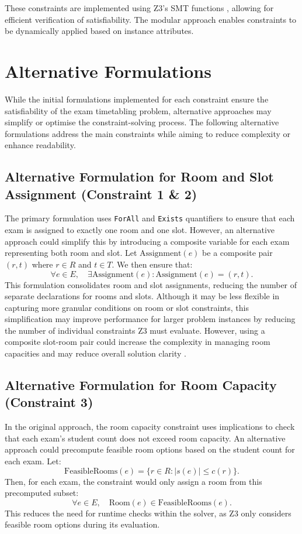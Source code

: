 \documentclass[a4paper]{article}
\begin{document}
    These constraints are implemented using Z3’s SMT functions \citep{Nieuwenhuis2006}, allowing for efficient verification of satisfiability. The modular approach enables constraints to be dynamically applied based on instance attributes.

    \section{Alternative Formulations}
    While the initial formulations implemented for each constraint ensure the satisfiability of the exam timetabling problem, alternative approaches may simplify or optimise the constraint-solving process. The following alternative formulations address the main constraints while aiming to reduce complexity or enhance readability.
    
    \subsection{Alternative Formulation for Room and Slot Assignment (Constraint 1 \& 2)}
    The primary formulation uses \texttt{ForAll} and \texttt{Exists} quantifiers to ensure that each exam is assigned to exactly one room and one slot. However, an alternative approach could simplify this by introducing a composite variable for each exam representing both room and slot. Let \( \text{Assignment}(e) \) be a composite pair \( (r, t) \) where \( r \in R \) and \( t \in T \). We then ensure that:
    \[
    \forall e \in E, \quad \exists \text{Assignment}(e) : \text{Assignment}(e) = (r, t).
    \]
    This formulation consolidates room and slot assignments, reducing the number of separate declarations for rooms and slots. Although it may be less flexible in capturing more granular conditions on room or slot constraints, this simplification may improve performance for larger problem instances by reducing the number of individual constraints Z3 must evaluate. However, using a composite slot-room pair could increase the complexity in managing room capacities and may reduce overall solution clarity \citep{Jovanovic2011}.
    
    \subsection{Alternative Formulation for Room Capacity (Constraint 3)}
    In the original approach, the room capacity constraint uses implications to check that each exam’s student count does not exceed room capacity. An alternative approach could precompute feasible room options based on the student count for each exam. Let:
    \[
    \text{FeasibleRooms}(e) = \{ r \in R : |s(e)| \leq c(r) \}.
    \]
    Then, for each exam, the constraint would only assign a room from this precomputed subset:
    \[
    \forall e \in E, \quad \text{Room}(e) \in \text{FeasibleRooms}(e).
    \]
    This reduces the need for runtime checks within the solver, as Z3 only considers feasible room options during its evaluation.
    
\end{document}
